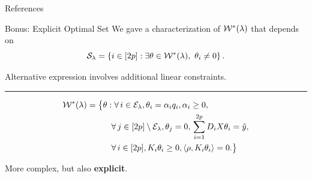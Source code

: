 \documentclass[usenames,dvipsnames,mathserif,notheorems]{beamer}
\newcommand{\horizontalrule}{
	{
			\vspace{-0.5em}
			\center \rule{\textwidth}{0.1em}
			\vspace{-0.2em}
		}
}
\begin{document}
\begin{frame}[allowframebreaks]{References}
	\printbibliography[]
\end{frame}


\begin{frame}{Bonus: Explicit Optimal Set}
	We gave a characterization of \( \mathcal{W}^*(\lambda) \) that depends on
	\[
		\mathcal{S}_\lambda
		= \left\{{i} \in [2p] : \exists \theta \in \mathcal{W}^*(\lambda), \
			\theta_i \neq 0\right\}.
	\]

	Alternative expression involves additional linear constraints.

	\pause
	\horizontalrule

	\begin{equation*}
		\begin{aligned}
			\mathcal{W}^*(\lambda) =
			\big\{ & \theta  :
			\forall \, {i}  \in  {\mathcal{E}_{\lambda}},
			\theta_i =  \alpha_{i} q_i, \alpha_{i} \geq 0, \,           \\
			       & \quad \forall \, j \in [2p] \setminus {\mathcal{E}_{\lambda}},
			\theta_{j} = 0, \, \sum_{i=1}^{2p} D_i X \theta_i = \hat y, \\
			       & \quad \forall \, i \in [2p],
			K_i \theta_i \geq 0, \left\langle\rho, K_i \theta_i \right\rangle = 0.
			\big\}
		\end{aligned}
	\end{equation*}

	\pause

	More complex, but also \textbf{explicit}.

\end{frame}
\end{document}
